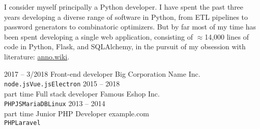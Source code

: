 \documentclass[9pt]{developercv} %
\begin{document}
\vspace{0.5cm}



\begin{minipage}[t]{0.4\textwidth} %
	\vspace{-\baselineskip} %

    I consider myself principally a Python developer. I have spent the past
    three years developing a diverse range of software in Python, from ETL
    pipelines to password generators to combinatoric optimizers. But by far most
    of my time has been spent developing a single web application, consisting of
    $\approx$14,000 lines of code in Python, Flask, and SQLAlchemy, in the pursuit
    of my obsession with literature: {\href{https://github.com/malan88/icc}{anno.wiki}}.
\end{minipage}
\hfill %
\begin{minipage}[t]{0.5\textwidth} %
	\vspace{-\baselineskip} %
	\begin{barchart}{5.5}
	\end{barchart}
\end{minipage}

\begin{center}
\end{center}



\begin{entrylist}
	\entry
		{2017 -- 3/2018}
		{Front-end developer}
		{Big Corporation Name Inc.}
		{\lorem \lorem \lorem\\ \texttt{node.js}\slashsep\texttt{Vue.js}\slashsep\texttt{Electron}}
	\entry
		{2015 -- 2018\\\footnotesize{part time}}
		{Full stack developer}
		{Famous Eshop Inc.}
		{\lorem\lorem\\ \texttt{PHP}\slashsep\texttt{JS}\slashsep\texttt{MariaDB}\slashsep\texttt{Linux}}
	\entry
		{2013 -- 2014\\\footnotesize{part time}}
		{Junior PHP Developer}
		{example.com}
		{\lorem\lorem\\ \texttt{PHP}\slashsep\texttt{Laravel}}
\end{entrylist}
\end{document}

